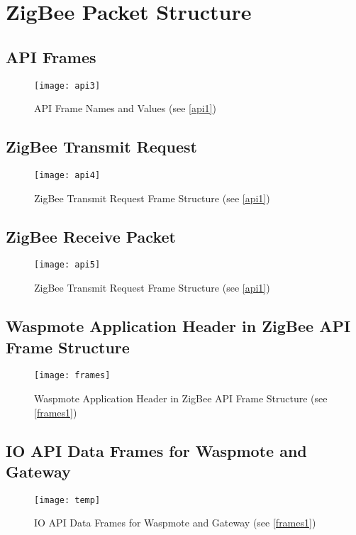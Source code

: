 \clearpage
\section{ZigBee Packet Structure }
\label{AppendixF} %

\subsection{API Frames}
\begin{figure}[htbp]
\centering
\texttt{[image: api3]}
\caption{API Frame Names and Values (see \ref{api1})}
\label{fig:api3 }
\end{figure}
\clearpage
\pagebreak
\subsection{ZigBee Transmit Request}
\begin{figure}[htbp]
\centering
\texttt{[image: api4]}
\caption{ZigBee Transmit Request Frame Structure (see \ref{api1})}
\label{fig:api4}
\end{figure}
\clearpage
\pagebreak
\subsection{ZigBee Receive Packet}
\begin{figure}[htbp]
\centering
\texttt{[image: api5]}
\caption{ZigBee Transmit Request Frame Structure (see \ref{api1})}
\label{fig:api5}
\end{figure}
\clearpage
\pagebreak
\subsection{Waspmote Application Header in ZigBee API Frame Structure}
\begin{figure}[htbp]
\centering
\texttt{[image: frames]}
\caption{Waspmote Application Header in ZigBee API Frame Structure (see \ref{frames1})}
\label{fig:frames}
\end{figure}
\clearpage
\pagebreak
\subsection{IO API Data Frames for Waspmote and Gateway}
\label{OwnProtocolLabel}
\begin{figure}[htbp]
\centering
\texttt{[image: temp]}
\caption{IO API Data Frames for Waspmote and Gateway (see \ref{frames1})}
\label{fig:OwnProtocol}
\end{figure}